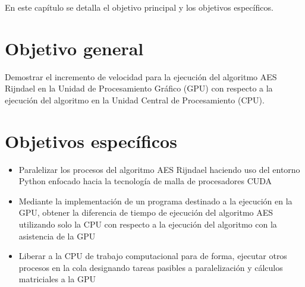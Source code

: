 \documentclass[../main/main.tex]{subfiles}
\begin{document}
\espacio

  En este capítulo se detalla el objetivo principal y los objetivos específicos.

  \section{Objetivo general}

  Demostrar el incremento de velocidad para la ejecución del algoritmo AES Rijndael en la Unidad de Procesamiento Gráfico (GPU) con respecto a la ejecución del algoritmo en la Unidad Central de Procesamiento (CPU).

  \section{Objetivos específicos}

  \begin{itemize}
    \item Paralelizar los procesos del algoritmo AES Rijndael haciendo uso del entorno Python enfocado hacia la tecnología de malla de procesadores CUDA
    \item Mediante la implementación de un programa destinado a la ejecución en la GPU, obtener la diferencia de tiempo de ejecución del algoritmo AES utilizando solo la CPU con respecto a la ejecución del algoritmo con la asistencia de la GPU
    \item Liberar a la CPU de trabajo computacional para de forma, ejecutar otros procesos en la cola designando tareas pasibles a paralelización y cálculos matriciales a la GPU
  \end{itemize}
\end{document}
